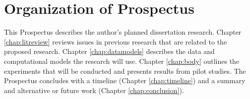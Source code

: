 \section{Organization of Prospectus}

This Prospectus describes the author's planned dissertation research. Chapter \ref{chap:litreview} reviews issues in previous research that are related to the proposed research. Chapter \ref{chap:datamodels} describes the data and computational models the research will use. Chapter \ref{chap:body} outlines the experiments that will be conducted and presents results from pilot studies. The Prospectus concludes with a timeline (Chapter \ref{chap:timeline}) and a summary and alternative or future work (Chapter \ref{chap:conclusion}).